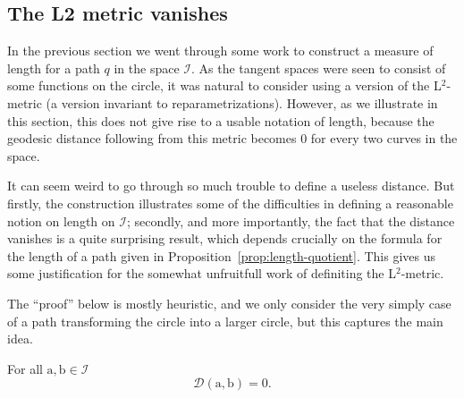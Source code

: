 \subsection{The L2 metric vanishes}
\label{sec:l2-metric-vanishes}

In the previous section we went through some work to construct a measure of length for a path $q$ in the space $\mathcal{I}$. As the tangent spaces were seen to consist of some functions on the circle, it was natural to consider using a version of the L$^2$-metric (a version invariant to reparametrizations). However, as we illustrate in this section, this does not give rise to a usable notation of length, because the geodesic distance following from this metric becomes 0 for every two curves in the space.

It can seem weird to go through so much trouble to define a useless distance. But firstly, the construction illustrates some of the difficulties in defining a reasonable notion on length on $\mathcal{I}$; secondly, and more importantly, the fact that the distance vanishes is a quite surprising result, which depends crucially on the formula for the length of a path given in Proposition~\ref{prop:length-quotient}. This gives us some justification for the somewhat unfruitfull work of definiting the L$^2$-metric.

The ``proof'' below is mostly heuristic, and we only consider the very simply case of a path transforming the circle into a larger circle, but this captures the main idea.
\begin{theorem}
  \label{theorem:l2-metric-vanishes}
  For all $\mathrm{a},\mathrm{b} \in \mathcal{I}$
  \begin{equation*}
    \mathcal{D}(\mathrm{a},\mathrm{b}) = 0.
  \end{equation*}
\end{theorem}

